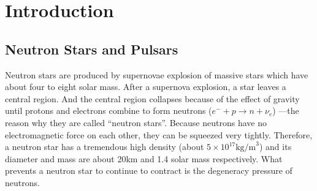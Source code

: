 \documentclass[a4paper, 12pt]{report}
\begin{document}




\cleardoublepage
{}
{}
\listoffigures

\cleardoublepage
{}
{}
\listoftables



 
\cleardoublepage
\newpage
\listoftables


\chapter{Introduction}   	   
  \section{Neutron Stars and Pulsars}
    Neutron stars are produced by supernovae explosion of massive stars which have about four 
    to eight solar mass. After a supernova explosion, a star leaves a central region. 
    And the central region collapses because of the effect of 
    gravity until protons and electrons combine to form neutrons 
    ($e^{-}+p\rightarrow n+\nu_{e}$) ---the reason why they are called ``neutron stars''.  
    Because neutrons have no electromagnetic force on each other, they can be squeezed very 
    tightly. Therefore, a neutron star has a tremendous high density 
    (about $5\times 10^{17} \mbox{kg/m}^3$) and its diameter and mass are about 20km and 
    1.4 solar mass respectively. What
    prevents a neutron star to continue to contract is the degeneracy pressure of neutrons. 
    
\end{document}
